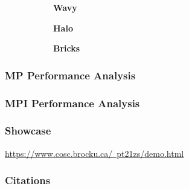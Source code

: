 \documentclass{beamer}
\begin{document}
\begin{frame}
	\begin{figure}[hbt!]
		\begin{subfigure}{.475\linewidth}
			\centering
			\textbf{\small Wavy}
			
			\label{plot:wavy}
		\end{subfigure}\hfill
		\begin{subfigure}{.475\linewidth}
			\centering
			\textbf{\small Halo}
			
			\label{plot:halo}
		\end{subfigure}
		\medskip
		\begin{subfigure}{.475\linewidth}
			\centering
			\textbf{\small Bricks}
			
			\label{plot:bricks}
		\end{subfigure}
	\end{figure}
\end{frame}

\newcommand{\SE}[2]{\footnotesize \(\begin{aligned}S&=#1\times \\[-5pt] E&=#2\% \end{aligned}\)}


\begin{frame}
	\frametitle{MP Performance Analysis}
	\centering
	\renewcommand{\arraystretch}{1.3}%
	
\end{frame}

\begin{frame}
	\frametitle{MPI Performance Analysis}
	\centering
	\renewcommand{\arraystretch}{1.3}%
	
\end{frame}



\begin{frame}
	\frametitle{Showcase}
	\href{https://www.cosc.brocku.ca/~pt21zs/demo.html}{https://www.cosc.brocku.ca/~pt21zs/demo.html}
\end{frame}

\begin{frame}
\frametitle{Citations}
\nocite{*}


\end{frame}
\end{document}
